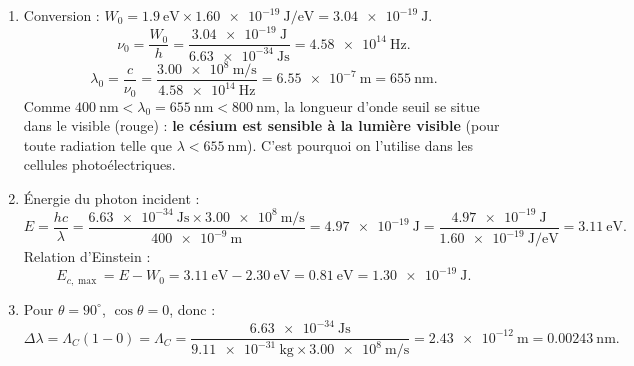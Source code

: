 \documentclass[11pt]{article}
\providecommand{\degree}{^{\circ}}
\begin{document}
\begin{corrige}
\begin{enumerate}
\item Conversion : $W_0 = \SI{1,9}{\electronvolt} \times \SI{1,60e-19}{\joule\per\electronvolt} = \SI{3,04e-19}{\joule}$.
\[ \nu_0 = \frac{W_0}{h} = \frac{\SI{3,04e-19}{\joule}}{\SI{6,63e-34}{\joule\second}} = \SI{4,58e14}{\hertz}. \]
\[ \lambda_0 = \frac{c}{\nu_0} = \frac{\SI{3,00e8}{\meter\per\second}}{\SI{4,58e14}{\hertz}} = \SI{6,55e-7}{\meter} = \SI{655}{\nano\meter}. \]
Comme $\SI{400}{\nano\meter} < \lambda_0 = \SI{655}{\nano\meter} < \SI{800}{\nano\meter}$, la longueur d'onde seuil se situe dans le visible (rouge) : \textbf{le césium est sensible à la lumière visible} (pour toute radiation telle que $\lambda < \SI{655}{\nano\meter}$). C'est pourquoi on l'utilise dans les cellules photoélectriques.
\item Énergie du photon incident :
\[ E = \frac{hc}{\lambda} = \frac{\SI{6,63e-34}{\joule\second}\times\SI{3,00e8}{\meter\per\second}}{\SI{400e-9}{\meter}} = \SI{4,97e-19}{\joule} = \frac{\SI{4,97e-19}{\joule}}{\SI{1,60e-19}{\joule\per\electronvolt}} = \SI{3,11}{\electronvolt}. \]
Relation d'Einstein :
\[ E_{c,\max} = E - W_0 = \SI{3,11}{\electronvolt} - \SI{2,30}{\electronvolt} = \SI{0,81}{\electronvolt} = \SI{1,30e-19}{\joule}. \]
\item Pour $\theta = 90\degree$, $\cos\theta = 0$, donc :
\[ \Delta\lambda = \Lambda_C(1-0) = \Lambda_C = \frac{\SI{6,63e-34}{\joule\second}}{\SI{9,11e-31}{\kilogram}\times\SI{3,00e8}{\meter\per\second}} = \SI{2,43e-12}{\meter} = \SI{0,00243}{\nano\meter}. \]
\end{enumerate}
\end{corrige}
\end{document}
